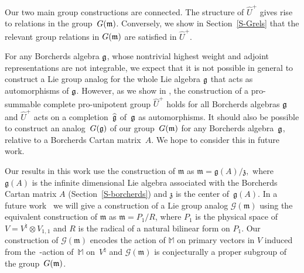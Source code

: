 \documentclass[11pt,letterpaper]{amsart}
\numberwithin{thecounter}{section}
\theoremstyle{definition}
\DeclareMathOperator{\SL}{SL}
\newcommand{\M}{{\mathbb M}}
\newcommand{\Uhp}{{\widehat{U}^+}}
\begin{document}
Our two main group constructions are connected.
The structure of  $\Uhp$ gives rise to relations in the group~$G(\frak m)$.   Conversely, we show in Section~\ref{S-Grels} that the relevant group relations in $G(\frak m)$ are satisfied in $\Uhp$. 
 
For any Borcherds algebra $\frak g$, whose nontrivial highest weight and adjoint representations are not  integrable, we expect that it is not possible in general to construct a Lie group analog for the whole Lie algebra $\frak g$ that acts as automorphisms of $\frak g$. However, as we show in \cite{ACJM2}, the construction of a pro-summable  complete pro-unipotent group $\Uhp$ holds for all Borcherds algebras $\frak g$ and $\Uhp$  acts on a completion~$\widehat{\frak g}$ of~$\frak g$ as automorphisms. 
It should also be possible to construct an analog~$G(\frak g)$ of our group~$G(\frak m)$ for any Borcherds algebra~$\frak g$, relative to a Borcherds  Cartan matrix~$A$. We hope to consider this in future work.



Our results in this work use the construction of $\mathfrak{m}$ as $\mathfrak{m}=\mathfrak{g}(A)/\mathfrak{z},$ where $\mathfrak g(A)$ is the infinite dimensional Lie algebra associated with  the Borcherds Cartan matrix $A$ (Section~\ref{S-borcherds}) and  $\mathfrak{z}$ is the center of~$\mathfrak g(A)$. In a future work~\cite{ACJKM2} we will give a construction  of a Lie group analog $\mathcal{G}(\mathfrak{m})$ using the equivalent construction of 
$\mathfrak{m}$ as $\mathfrak{m}=P_1/R$, where  $P_1$ is the physical space of $V=V^\natural\otimes V_{{1,1}}$ and $R$ is the radical of a natural bilinear form on $P_1$. Our construction of $\mathcal{G}(\mathfrak{m})$
encodes the action of $\M$ on primary vectors in $V$ induced from the~\cite{FLM}-action of~$\M$ on~$V^\natural$ and $\mathcal{G}(\mathfrak{m})$  is conjecturally a proper subgroup of the group~$G(\frak m)$.
\end{document}
